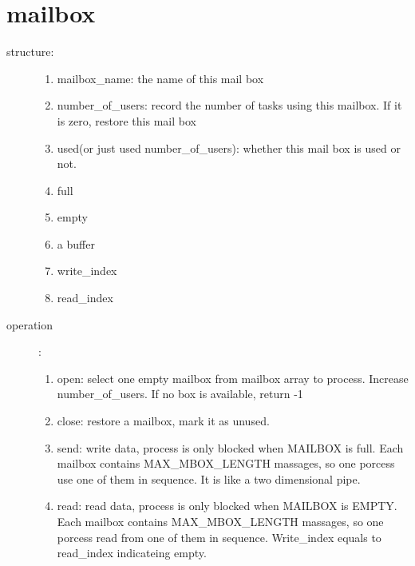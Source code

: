 \documentclass{article}
\begin{document}
\section{mailbox}
\begin{description}
\item[structure:]
  \begin{enumerate}
  \item mailbox\_name: the name of this mail box
  \item number\_of\_users: record the number of tasks using this mailbox. If it is zero, restore this mail box
  \item used(or just used number\_of\_users): whether this mail box is used or not.
  \item full
  \item empty
  \item a buffer
  \item write\_index
  \item read\_index
  \end{enumerate}
\item[operation]:
  \begin{enumerate}
  \item open: select one empty mailbox from mailbox array to process. Increase number\_of\_users. If no box is available, return -1
  \item close: restore a mailbox, mark it as unused.
  \item send: write data, process is only blocked when MAILBOX is full. Each mailbox contains MAX\_MBOX\_LENGTH massages, so one porcess use one of them in sequence. It is like a two dimensional pipe.
  \item read: read data, process is only blocked when MAILBOX is EMPTY. Each mailbox contains MAX\_MBOX\_LENGTH massages, so one porcess read from one of them in sequence. Write\_index equals to read\_index indicateing empty.
  \end{enumerate}
\end{description}
\end{document}
